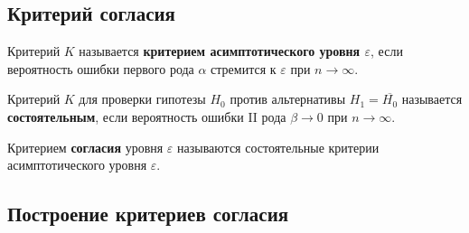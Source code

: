 \subsection{Критерий согласия}

\begin{definition}
    Критерий \(K\) называется \textbf{критерием асимптотического уровня \(\varepsilon\)}, если вероятность ошибки первого рода \(\alpha\) стремится к \(\varepsilon\) при \(n \to \infty\).
\end{definition}

\begin{definition}
    Критерий \(K\) для проверки гипотезы \(H_0\) против альтернативы \(H_1 = \overline{H_0}\) называется \textbf{состоятельным}, если вероятность ошибки II рода \(\beta \to 0\) при \(n \to \infty\).
\end{definition}

\begin{definition}
    Критерием \textbf{согласия} уровня \(\varepsilon\) называются состоятельные критерии асимптотического уровня \(\varepsilon\).
\end{definition}

\subsection{Построение критериев согласия}


